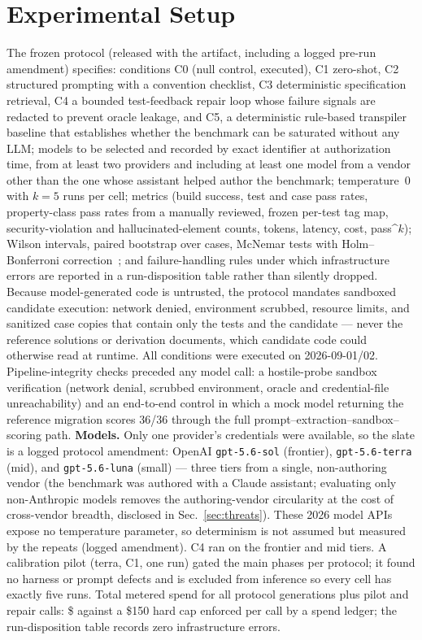 \documentclass[journal]{IEEEtran}
\begin{document}
\section{Experimental Setup}
\label{sec:setup}
The frozen protocol (released with the artifact, including a logged pre-run amendment) specifies:
conditions C0 (null control, executed), C1 zero-shot, C2 structured prompting with a convention
checklist, C3 deterministic specification retrieval, C4 a bounded test-feedback repair loop
whose failure signals are redacted to prevent oracle leakage, and C5, a deterministic
rule-based transpiler baseline that establishes whether the benchmark can be saturated without
any LLM; models to be selected and recorded by exact identifier at authorization time, from at
least two providers and including at least one model from a vendor other than the one whose
assistant helped author the benchmark; temperature~0 with $k{=}5$ runs per cell; metrics
(build success, test and case pass rates, property-class pass rates from a manually reviewed,
frozen per-test tag map, security-violation and hallucinated-element counts, tokens, latency,
cost, pass\textasciicircum{}$k$); Wilson intervals, paired bootstrap over cases, McNemar tests
with Holm--Bonferroni correction~\cite{miller2024errorbars, efron1979bootstrap,
dror2018hitchhiker}; and failure-handling rules under which infrastructure errors are reported
in a run-disposition table rather than silently dropped. Because model-generated code is
untrusted, the protocol mandates sandboxed candidate execution: network denied, environment
scrubbed, resource limits, and sanitized case copies that contain only the tests and the
candidate --- never the reference solutions or derivation documents, which candidate code
could otherwise read at runtime.
All conditions were executed on 2026-09-01/02. Pipeline-integrity checks preceded any model
call: a hostile-probe sandbox verification (network denial, scrubbed environment, oracle and
credential-file unreachability) and an end-to-end control in which a mock model returning the
reference migration scores 36/36 through the full prompt--extraction--sandbox--scoring path.
\textbf{Models.} Only one provider's credentials were available, so the slate is a logged
protocol amendment: OpenAI \texttt{gpt-5.6-sol} (frontier), \texttt{gpt-5.6-terra} (mid),
and \texttt{gpt-5.6-luna} (small) --- three tiers from a single, non-authoring vendor (the
benchmark was authored with a Claude assistant; evaluating only non-Anthropic models removes
the authoring-vendor circularity at the cost of cross-vendor breadth, disclosed in
Sec.~\ref{sec:threats}). These 2026 model APIs expose no temperature parameter, so
determinism is not assumed but measured by the repeats (logged amendment). C4 ran on the
frontier and mid tiers. A calibration pilot (terra, C1, one run) gated the main phases per
protocol; it found no harness or prompt defects and is excluded from inference so every cell
has exactly five runs. Total metered spend for all \PTwoGens{} protocol generations plus
pilot and \RepairCalls{} repair calls: \$\SpendTotal{} against a \$150 hard cap enforced
per call by a spend ledger; the run-disposition table records zero infrastructure errors.
\end{document}
